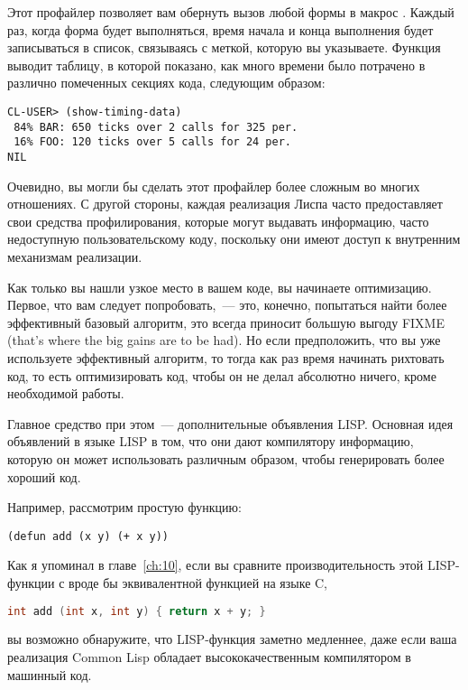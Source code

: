 Этот профайлер позволяет вам обернуть вызов любой формы в макрос
. Каждый раз, когда форма будет выполняться, время начала и конца
выполнения будет записываться в список, связываясь с меткой, которую вы
указываете. Функция  выводит таблицу, в которой показано, как много
времени было потрачено в различно помеченных секциях кода, следующим образом:

\begin{lstlisting}
CL-USER> (show-timing-data)
 84% BAR: 650 ticks over 2 calls for 325 per.
 16% FOO: 120 ticks over 5 calls for 24 per.
NIL
\end{lstlisting}

Очевидно, вы могли бы сделать этот профайлер более сложным во многих отношениях. С другой
стороны, каждая реализация Лиспа часто предоставляет свои средства профилирования, которые
могут выдавать информацию, часто недоступную пользовательскому коду, поскольку они имеют
доступ к внутренним механизмам реализации.

Как только вы нашли узкое место в вашем коде, вы начинаете оптимизацию. Первое, что вам
следует попробовать,~--- это, конечно, попытаться найти более эффективный базовый
алгоритм, это всегда приносит большую выгоду FIXME (that's where the big gains are to be
had). Но если предположить, что вы уже используете эффективный алгоритм, то тогда как раз
время начинать рихтовать код, то есть оптимизировать код, чтобы он не делал абсолютно
ничего, кроме необходимой работы.

Главное средство при этом~--- дополнительные объявления LISP. Основная идея объявлений в
языке LISP в том, что они дают компилятору информацию, которую он может использовать
различным образом, чтобы генерировать более хороший код.

Например, рассмотрим простую функцию:

\begin{lstlisting}
(defun add (x y) (+ x y))
\end{lstlisting}

Как я упоминал в главе~\ref{ch:10}, если вы сравните производительность этой LISP-функции
с вроде бы эквивалентной функцией на языке C,

\begin{lstlisting}[language=C]
int add (int x, int y) { return x + y; }
\end{lstlisting}

вы возможно обнаружите, что LISP-функция заметно медленнее, даже если ваша реализация
Common Lisp обладает высококачественным компилятором в машинный код.

